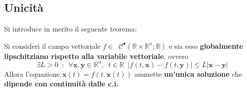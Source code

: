 \documentclass[10pt]{article}
\theoremstyle{plain}
\begin{document}
\subsection{Unicità}
Si introduce in merito il seguente teorema:
\begin{ther}
Si consideri il campo vettoriale $f \in \enspace \mathcal{C}^{•}(\mathbb{R} \times \mathbb{R}^n; \mathbb{R})$ e sia esso \textbf{globalmente lipschitziano rispetto alla variabile vettoriale}, ovvero
\[\exists L > 0 \enspace : \enspace \forall \mathbf{x}, \mathbf{y} \in \mathbb{R}^n, \enspace t \in \mathbb{R} \enspace |f(t, \mathbf{x}) - f(t, \mathbf{y})| \leq L |\mathbf{x} - \mathbf{y}|\]
Allora l'equazione $\dot{\mathbf{x}}(t) = f(t, \mathbf{x}(t))$ ammette \textbf{un'unica soluzione} che \textbf{dipende con continuità dalle c.i.}
\end{ther}
\end{document}
